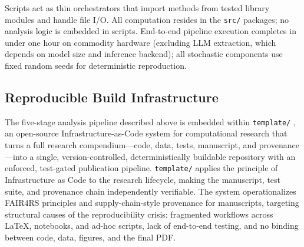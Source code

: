 \documentclass[
  english,
]{article}
\begin{document}
Scripts act as thin orchestrators that import methods from tested
library modules and handle file I/O. All computation resides in the
\texttt{src/} packages; no analysis logic is embedded in scripts.
End-to-end pipeline execution completes in under one hour on commodity
hardware (excluding LLM extraction, which depends on model size and
inference backend); all stochastic components use fixed random seeds for
deterministic reproduction.

\subsection{Reproducible Build
Infrastructure}\label{reproducible-build-infrastructure}

The five-stage analysis pipeline described above is embedded within
\texttt{template/}
\citep{Friedman2026TemplateReproducibleGenerative, FriedmanTemplateSoftware},
an open-source Infrastructure-as-Code system for computational research
that turns a full research compendium---code, data, tests, manuscript,
and provenance---into a single, version-controlled, deterministically
buildable repository with an enforced, test-gated publication pipeline.
\texttt{template/} applies the principle of Infrastructure as Code to
the research lifecycle, making the manuscript, test suite, and
provenance chain independently verifiable. The system operationalizes
FAIR4RS principles \citep{wilkinson2016fair} and supply-chain-style
provenance for manuscripts, targeting structural causes of the
reproducibility crisis: fragmented workflows across LaTeX, notebooks,
and ad-hoc scripts, lack of end-to-end testing, and no binding between
code, data, figures, and the final PDF.
\end{document}
